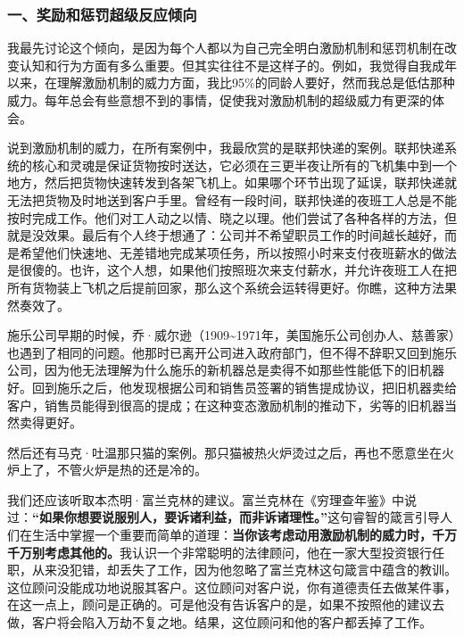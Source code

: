 \subsubsection*{一、奖励和惩罚超级反应倾向}

我最先讨论这个倾向，是因为每个人都以为自己完全明白激励机制和惩罚机制在改变认知和行为方面有多么重要。但其实往往不是这样子的。例如，我觉得自我成年以来，在理解激励机制的威力方面，我比95\%的同龄人要好，然而我总是低估那种威力。每年总会有些意想不到的事情，促使我对激励机制的超级威力有更深的体会。
\par

说到激励机制的威力，在所有案例中，我最欣赏的是联邦快递的案例。联邦快递系统的核心和灵魂是保证货物按时送达，它必须在三更半夜让所有的飞机集中到一个地方，然后把货物快速转发到各架飞机上。如果哪个环节出现了延误，联邦快递就无法把货物及时地送到客户手里。曾经有一段时间，联邦快递的夜班工人总是不能按时完成工作。他们对工人动之以情、晓之以理。他们尝试了各种各样的方法，但就是没效果。最后有个人终于想通了：公司并不希望职员工作的时间越长越好，而是希望他们快速地、无差错地完成某项任务，所以按照小时来支付夜班薪水的做法是很傻的。也许，这个人想，如果他们按照班次来支付薪水，并允许夜班工人在把所有货物装上飞机之后提前回家，那么这个系统会运转得更好。你瞧，这种方法果然奏效了。
\par

施乐公司早期的时候，乔·威尔逊（1909\textasciitilde{}1971年，美国施乐公司创办人、慈善家）也遇到了相同的问题。他那时已离开公司进入政府部门，但不得不辞职又回到施乐公司，因为他无法理解为什么施乐的新机器总是卖得不如那些性能低下的旧机器好。回到施乐之后，他发现根据公司和销售员签署的销售提成协议，把旧机器卖给客户，销售员能得到很高的提成；在这种变态激励机制的推动下，劣等的旧机器当然卖得更好。
\par

然后还有马克·吐温那只猫的案例。那只猫被热火炉烫过之后，再也不愿意坐在火炉上了，不管火炉是热的还是冷的。
\par

我们还应该听取本杰明·富兰克林的建议。富兰克林在《穷理查年鉴》中说过：\textbf{“如果你想要说服别人，要诉诸利益，而非诉诸理性。”}这句睿智的箴言引导人们在生活中掌握一个重要而简单的道理：\textbf{当你该考虑动用激励机制的威力时，千万千万别考虑其他的。}我认识一个非常聪明的法律顾问，他在一家大型投资银行任职，从来没犯错，却丢失了工作，因为他忽略了富兰克林这句箴言中蕴含的教训。这位顾问没能成功地说服其客户。这位顾问对客户说，你有道德责任去做某件事，在这一点上，顾问是正确的。可是他没有告诉客户的是，如果不按照他的建议去做，客户将会陷入万劫不复之地。结果，这位顾问和他的客户都丢掉了工作。
\par

